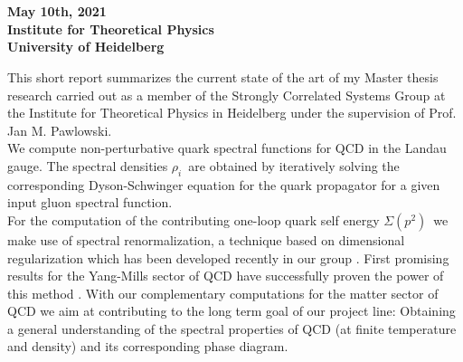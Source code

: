 \begin{center}

	\makeatletter
	\thispagestyle{plain}
	\LARGE\bfseries{\@title} \\
 	\vspace{4mm}
	\large\bfseries{\@author} \\
	\normalfont
	\vspace{4mm}
	\large{May 10th, 2021} \\
	\vspace{2mm}
	\large{Institute for Theoretical Physics \\
		University of Heidelberg } \\
	\makeatother
\end{center}

\normalsize
\noindent This short report summarizes the current state of the art of my Master thesis research carried out as a member of the Strongly Correlated Systems Group at the Institute for Theoretical Physics in Heidelberg  under the supervision of Prof. Jan M. Pawlowski. \\

\noindent  We compute non-perturbative quark spectral functions for QCD in the Landau gauge. The spectral densities $\rho_i$\ are obtained by iteratively solving the corresponding Dyson-Schwinger equation for the quark propagator for a given input gluon spectral function.\\
 For the computation of the contributing one-loop quark self energy $\Sigma(p^2)$\ we make use of spectral renormalization, a technique based on dimensional regularization which has been developed recently in our group  \cite{Horak2019, Wink2020, HorakPawlowskiWink2020}. First promising results for the Yang-Mills sector of QCD have successfully proven the power of this method \cite{HorakPapavassiliouPawlowskiWink2021}. With our complementary computations for the matter sector of QCD we aim at contributing to the long term goal of our project line: Obtaining a general understanding of the spectral properties of QCD (at finite temperature and density) and its corresponding  phase diagram.